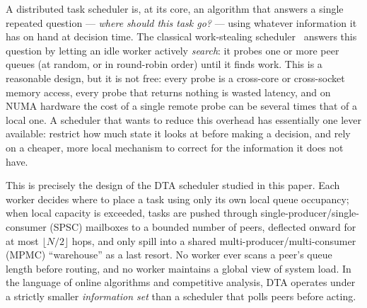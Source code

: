 \documentclass[11pt,a4paper]{report}
\begin{document}
A distributed task scheduler is, at its core, an algorithm that answers a
single repeated question --- \emph{where should this task go?} --- using
whatever information it has on hand at decision time.  The classical
work-stealing scheduler~\cite{blumofe1999,arora2001,tokio} answers this
question by letting an idle worker actively \emph{search}: it probes one
or more peer queues (at random, or in round-robin order) until it finds
work.  This is a reasonable design, but it is not free: every probe is a
cross-core or cross-socket memory access, every probe that returns nothing
is wasted latency, and on NUMA hardware the cost of a single remote probe
can be several times that of a local one. A scheduler that wants to reduce
this overhead has essentially one lever available: restrict how much
state it looks at before making a decision, and rely on a cheaper, more
local mechanism to correct for the information it does not have.

This is precisely the design of the \textsc{DTA} scheduler studied in
this paper. Each worker decides where to place a task using only its own
local queue occupancy; when local capacity is exceeded, tasks are pushed
through single-producer/single-consumer (SPSC) mailboxes to a bounded
number of peers, deflected onward for at most $\lfloor N/2 \rfloor$ hops,
and only spill into a shared multi-producer/multi-consumer (MPMC)
``warehouse'' as a last resort. No worker ever scans a peer's queue length
before routing, and no worker maintains a global view of system load. In
the language of online algorithms and competitive analysis, DTA operates
under a strictly smaller \emph{information set} than a scheduler that
polls peers before acting.
\end{document}
